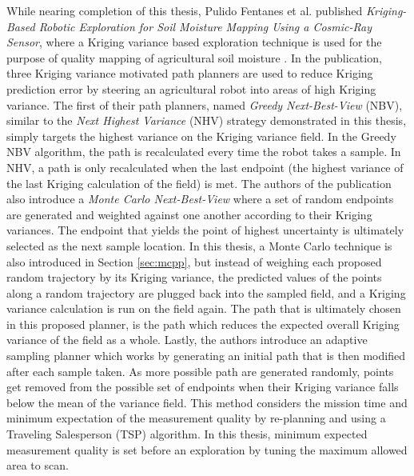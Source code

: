 While nearing completion of this thesis, Pulido Fentanes et al. published \textit{Kriging-Based Robotic Exploration for Soil Moisture Mapping Using a Cosmic-Ray Sensor}, where a Kriging variance based exploration technique is used for the purpose of quality mapping of agricultural soil moisture \cite{fentanes:soilkrig}. In the publication, three Kriging variance motivated path planners are used to reduce Kriging prediction error by steering an agricultural robot into areas of high Kriging variance. The first of their path planners, named \textit{Greedy Next-Best-View} (NBV), similar to the \textit{Next Highest Variance} (NHV) strategy demonstrated in this thesis, simply targets the highest variance on the Kriging variance field. In the Greedy NBV algorithm, the path is recalculated every time the robot takes a sample. In NHV, a path is only recalculated when the last endpoint (the highest variance of the last Kriging calculation of the field) is met. The authors of the publication also introduce a \textit{Monte Carlo Next-Best-View} where a set of random endpoints are generated and weighted against one another according to their Kriging variances. The endpoint that yields the point of highest uncertainty is ultimately selected as the next sample location. In this thesis, a Monte Carlo technique is also introduced in Section \ref{sec:mcpp}, but instead of weighing each proposed random trajectory by its Kriging variance, the predicted values of the points along a random trajectory are plugged back into the sampled field, and a Kriging variance calculation is run on the field again. The path that is ultimately chosen in this proposed planner, is the path which reduces the expected overall Kriging variance of the field as a whole. Lastly, the authors introduce an adaptive sampling planner which works by generating an initial path that is then modified after each sample taken. As more possible path are generated randomly, points get removed from the possible set of endpoints when their Kriging variance falls below the mean of the variance field. This method considers the mission time and minimum expectation of the measurement quality by re-planning and using a Traveling Salesperson (TSP) algorithm. In this thesis, minimum expected measurement quality is set before an exploration by tuning the maximum allowed area to scan.
